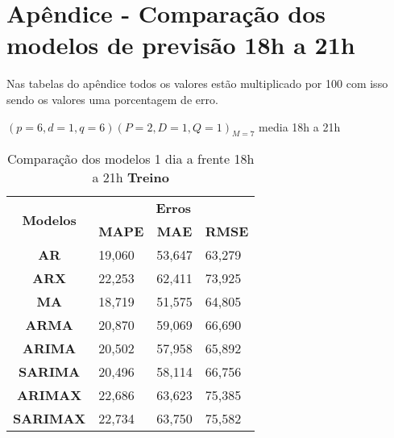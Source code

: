 
\section{Apêndice - Comparação dos modelos de previsão 18h a 21h}\label{sec:comtb18}

Nas tabelas do apêndice todos os valores estão multiplicado por 100 com isso sendo os valores uma porcentagem de erro.

	$(p = 6,d = 1,q = 6) (P = 2,D = 1,Q = 1)_{M = 7}$ media 18h a 21h
	\begin{table}[H]
		\centering
		\caption{Comparação dos modelos 1 dia a frente 18h a 21h \textbf{Treino} }\label{tb:1-18trn}
\begin{tabular}{@{}clll@{}}
	\toprule
	\multirow{2}{*}{\textbf{Modelos}} & \multicolumn{3}{c}{\textbf{Erros}}                                                                       \\ \cmidrule(l){2-4} 
	& \multicolumn{1}{c}{\textbf{MAPE}} & \multicolumn{1}{c}{\textbf{MAE}} & \multicolumn{1}{c}{\textbf{RMSE}} \\ \hline
	\textbf{AR}                       & 19,060                            & 53,647                           & 63,279                            \\
	\textbf{ARX}                      & 22,253                            & 62,411                           & 73,925                            \\
	\textbf{MA}                       & 18,719                            & 51,575                           & 64,805                            \\
	\textbf{ARMA}                     & 20,870                            & 59,069                           & 66,690                            \\
	\textbf{ARIMA}                    & 20,502                            & 57,958                           & 65,892                            \\
	\textbf{SARIMA}                   & 20,496                            & 58,114                           & 66,756                            \\
	\textbf{ARIMAX}                   & 22,686                            & 63,623                           & 75,385                            \\
	\textbf{SARIMAX}                  & 22,734                            & 63,750                           & 75,582                            \\

\end{tabular}
\end{table}
